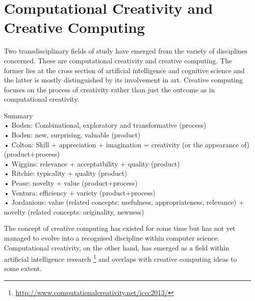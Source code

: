 \section{Computational Creativity and Creative Computing}

Two transdisciplinary fields of study have emerged from the variety of disciplines concerned. These are computational creativity and creative computing. The former lies at the cross section of artificial intelligence and cognitive science and the latter is mostly distinguished by its involvement in art. Creative computing focuses on the process of creativity rather than just the outcome as in computational creativity.

\begin{shaded}
  Summary\\
  •	Boden: Combinational, exploratory and transformative \citep{Boden2003, Wiggins2006} (process)\\
  •	Boden: new, surprising, valuable \citep{Boden2003} (product)\\
  •	Colton: Skill + appreciation + imagination = creativity (or the appearance of) \citep{Colton2008a} (product+process)\\
  •	Wiggins: relevance + acceptatbility + quality \citep{Wiggins2006} (product)\\
  •	Ritchie: typicality + quality \citep{Ritchie2001, Ritchie2007} (product)\\
  •	Pease: novelty + value \citep{Pease2001} (product+process)\\
  •	Ventura: efficiency + variety \citep{Ventura2008} (product+process)\\
  •	Jordanious: value (related concepts: usefulness, appropriateness, relevance) + novelty (related concepts: originality, newness) \citep{Jordanous2012}
\end{shaded}


The concept of creative computing has existed for some time but has not yet managed to evolve into a recognised discipline within computer science. Computational creativity, on the other hand, has emerged as a field within artificial intelligence research \footnote{\url{http://www.computationalcreativity.net/iccc2013/}} and overlaps with creative computing ideas to some extent.

